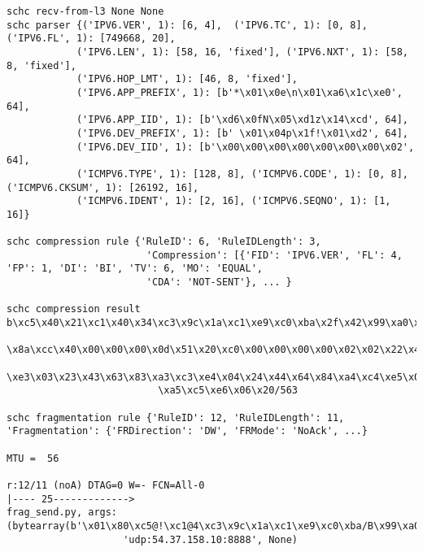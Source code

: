 \begin{lstlisting}[basicstyle=\ttfamily\tiny, numbers=none]
schc recv-from-l3 None None
schc parser {('IPV6.VER', 1): [6, 4],  ('IPV6.TC', 1): [0, 8],  ('IPV6.FL', 1): [749668, 20], 
            ('IPV6.LEN', 1): [58, 16, 'fixed'], ('IPV6.NXT', 1): [58, 8, 'fixed'], 
            ('IPV6.HOP_LMT', 1): [46, 8, 'fixed'], 
            ('IPV6.APP_PREFIX', 1): [b'*\x01\x0e\n\x01\xa6\x1c\xe0', 64], 
            ('IPV6.APP_IID', 1): [b'\xd6\x0fN\x05\xd1z\x14\xcd', 64], 
            ('IPV6.DEV_PREFIX', 1): [b' \x01\x04p\x1f!\x01\xd2', 64], 
            ('IPV6.DEV_IID', 1): [b'\x00\x00\x00\x00\x00\x00\x00\x02', 64], 
            ('ICMPV6.TYPE', 1): [128, 8], ('ICMPV6.CODE', 1): [0, 8], ('ICMPV6.CKSUM', 1): [26192, 16], 
            ('ICMPV6.IDENT', 1): [2, 16], ('ICMPV6.SEQNO', 1): [1, 16]}

schc compression rule {'RuleID': 6, 'RuleIDLength': 3, 
                        'Compression': [{'FID': 'IPV6.VER', 'FL': 4, 'FP': 1, 'DI': 'BI', 'TV': 6, 'MO': 'EQUAL', 
                        'CDA': 'NOT-SENT'}, ... }

schc compression result b\xc5\x40\x21\xc1\x40\x34\xc3\x9c\x1a\xc1\xe9\xc0\xba\x2f\x42\x99\xa0\x00\x40\x00\x31\x38
                          \x8a\xcc\x40\x00\x00\x00\x0d\x51\x20\xc0\x00\x00\x00\x00\x02\x02\x22\x42\x62\x82\xa2\xc2
                          \xe3\x03\x23\x43\x63\x83\xa3\xc3\xe4\x04\x24\x44\x64\x84\xa4\xc4\xe5\x05\x25\x45\x65\x85
                          \xa5\xc5\xe6\x06\x20/563
                          
schc fragmentation rule {'RuleID': 12, 'RuleIDLength': 11, 'Fragmentation': {'FRDirection': 'DW', 'FRMode': 'NoAck', ...}

MTU =  56

r:12/11 (noA) DTAG=0 W=- FCN=All-0
|---- 25------------->
frag_send.py, args: (bytearray(b'\x01\x80\xc5@!\xc1@4\xc3\x9c\x1a\xc1\xe9\xc0\xba/B\x99\xa0\x00@\x0018\x8a'), 
                    'udp:54.37.158.10:8888', None)


\end{lstlisting}

